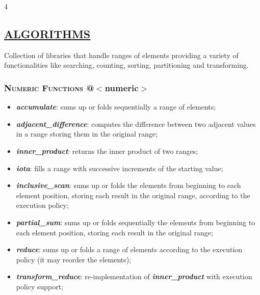\documentclass[10pt]{article}
\newcommand{\softseparator}{%
  \par\noindent{\color{RuleGray}\rule{\linewidth}{0.35pt}}\vspace{1pt}
}
\begin{document}
\begin{multicols*}{4}
\softseparator

{\color{Blue}
\subsection*{\href{https://en.cppreference.com/w/cpp/algorithm}{\underline{ALGORITHMS}}}	
\noindent  
Collection of libraries that handle ranges of elements providing a variety of functionalities like searching, counting, sorting, partitioning and transforming.

\subsubsection*{\textsc{Numeric Functions}  @$<$numeric$>$} 
\begin{itemize}[leftmargin=*,topsep=0.25pt]
  \setlength\itemsep{-1.8pt}
	\item  \emph{\textbf{accumulate}}: sums up or folds sequentially a range of elements;
		\item  \emph{\textbf{adjacent\_difference}}: computes the difference between two adjacent values in a range storing them in the original range;
	\item  \emph{\textbf{inner\_product}}: returns the inner product of two ranges;
	\item  \emph{\textbf{iota}}: fills a range with successive increments of the starting value;
	\item  \emph{\textbf{inclusive\_scan}}: sums up or folds the elements from beginning to each element position, storing each result in the original range, according to the execution policy;
	\item  \emph{\textbf{partial\_sum}}: sums up or folds sequentially the elements from beginning to each element position, storing each result in the original range;
\item  \emph{\textbf{reduce}}: sums up or folds a range of elements according to the execution policy (it may reorder the elements);
	\item  \emph{\textbf{transform\_reduce}}: re-implementation of \emph{\textbf{inner\_product}} with execution policy support;
	\end{itemize}

}
\end{multicols*}
\end{document}
